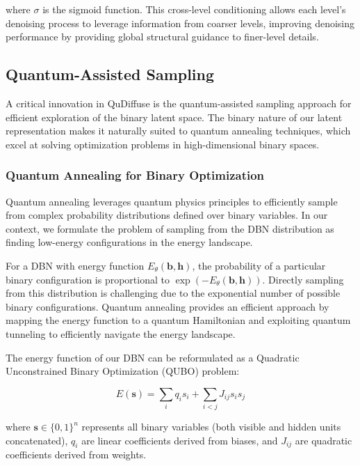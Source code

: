 \documentclass[10pt,twocolumn,letterpaper]{article}
\newcommand{\bm}[1]{\boldsymbol{#1}}
\newcommand{\binary}{\bm{b}}
\begin{document}
where $\sigma$ is the sigmoid function. This cross-level conditioning allows each level's denoising process to leverage information from coarser levels, improving denoising performance by providing global structural guidance to finer-level details.

\subsection{Quantum-Assisted Sampling}
\label{sec:quantum_sampling}

A critical innovation in QuDiffuse is the quantum-assisted sampling approach for efficient exploration of the binary latent space. The binary nature of our latent representation makes it naturally suited to quantum annealing techniques, which excel at solving optimization problems in high-dimensional binary spaces.

\subsubsection{Quantum Annealing for Binary Optimization}
Quantum annealing leverages quantum physics principles to efficiently sample from complex probability distributions defined over binary variables. In our context, we formulate the problem of sampling from the DBN distribution as finding low-energy configurations in the energy landscape.

For a DBN with energy function $E_\theta(\binary, \bm{h})$, the probability of a particular binary configuration is proportional to $\exp(-E_\theta(\binary, \bm{h}))$. Directly sampling from this distribution is challenging due to the exponential number of possible binary configurations. Quantum annealing provides an efficient approach by mapping the energy function to a quantum Hamiltonian and exploiting quantum tunneling to efficiently navigate the energy landscape.

The energy function of our DBN can be reformulated as a Quadratic Unconstrained Binary Optimization (QUBO) problem:

\begin{equation}
E(\bm{s}) = \sum_i q_i s_i + \sum_{i<j} J_{ij} s_i s_j
\end{equation}

where $\bm{s} \in \{0,1\}^n$ represents all binary variables (both visible and hidden units concatenated), $q_i$ are linear coefficients derived from biases, and $J_{ij}$ are quadratic coefficients derived from weights.
\end{document}
